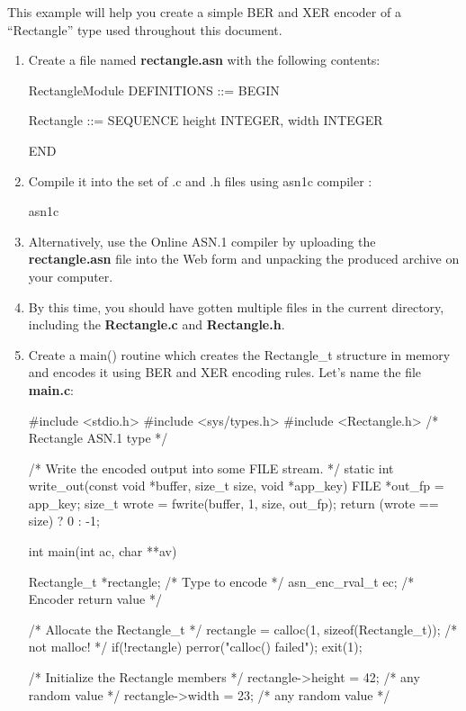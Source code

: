 \documentclass[english,oneside,12pt]{book}
\begin{document}
This example will help you create a simple BER and XER encoder of
a ``Rectangle'' type used throughout this document.
\begin{enumerate}
\item Create a file named \textbf{rectangle.asn} with the following contents:

\begin{asn}
RectangleModule DEFINITIONS ::= BEGIN

Rectangle ::= SEQUENCE {
    height  INTEGER,
    width   INTEGER
}

END
\end{asn}
\item Compile it into the set of .c and .h files using asn1c compiler \cite{ASN1C}:

\begin{bash}
asn1c %
\end{bash}
\item Alternatively, use the Online ASN.1 compiler \cite{AONL} by uploading
the \textbf{rectangle.asn} file into the Web form and unpacking the
produced archive on your computer.
\item By this time, you should have gotten multiple files in the current
directory, including the \textbf{Rectangle.c} and \textbf{Rectangle.h}.
\item Create a main() routine which creates the Rectangle\_t structure in
memory and encodes it using BER and XER encoding rules. Let's name
the file \textbf{main.c}:

\begin{codesample}[basicstyle=\scriptsize\listingfont]
#include <stdio.h>
#include <sys/types.h>
#include <Rectangle.h>   /* Rectangle ASN.1 type  */

/* Write the encoded output into some FILE stream. */
static int write_out(const void *buffer, size_t size, void *app_key) {
    FILE *out_fp = app_key;
    size_t wrote = fwrite(buffer, 1, size, out_fp);
    return (wrote == size) ? 0 : -1;
}
 
int main(int ac, char **av) {
    Rectangle_t *rectangle; /* Type to encode        */
    asn_enc_rval_t ec;      /* Encoder return value  */

    /* Allocate the Rectangle_t */
    rectangle = calloc(1, sizeof(Rectangle_t)); /* not malloc! */
    if(!rectangle) {
        perror("calloc() failed");
        exit(1);
    }

    /* Initialize the Rectangle members */
    rectangle->height = 42;  /* any random value */
    rectangle->width  = 23;  /* any random value */

}
\end{codesample}
\end{enumerate}
\end{document}
